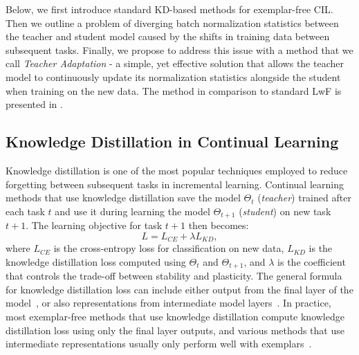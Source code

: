 \documentclass[10pt,twocolumn,letterpaper]{article}
\begin{document}
Below, we first introduce standard KD-based methods for exemplar-free CIL. Then we outline a problem of diverging batch normalization statistics between the teacher and student model caused by the shifts in training data between subsequent tasks. Finally, we propose to address this issue with a method that we call \emph{Teacher Adaptation} - a simple, yet effective solution that allows the teacher model to continuously update its normalization statistics alongside the student when training on the new data. The method in comparison to standard LwF is presented in . 


\subsection{Knowledge Distillation in Continual Learning}
\label{sec:kd_in_cl}

Knowledge distillation is one of the most popular techniques employed to reduce forgetting between subsequent tasks in incremental learning. Continual learning methods that use knowledge distillation save the model $\Theta_{t}$ (\emph{teacher}) trained after each task $t$ and use it during learning the model $\Theta_{t+1}$ (\emph{student}) on new task $t+1$. The learning objective for task $t+1$ then becomes:
\begin{equation}
    L = L_{CE} + \lambda L_{KD},
\end{equation}
where $L_{CE}$ is the cross-entropy loss for classification on new data, $L_{KD}$ is the knowledge distillation loss computed using $\Theta_{t}$ and $\Theta_{t+1}$, and $\lambda$ is the coefficient that controls the trade-off between stability and plasticity. The general formula for knowledge distillation loss can include either output from the final layer of the model~\cite{li2017learning,rebuffi2017icarl,ahn2021ss}, or also representations from intermediate model layers~\cite{dhar2019learning,douillard2020podnet}. In practice, most exemplar-free methods that use knowledge distillation compute knowledge distillation loss using only the final layer outputs, and various methods that use intermediate representations usually only perform well with exemplars~\cite{smith2023closer}.
\end{document}
